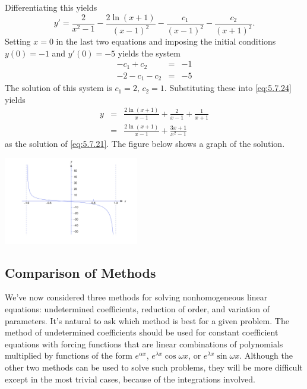 \documentclass{ximera}
\begin{document}
\begin{example}
\begin{explanation}
\begin{equation}
\end{equation}
Differentiating this yields
$$
y'=\frac{2}{x^2-1}-\frac{2\ln(x+1)}{(x-1)^2}-\frac{c_1}{(x-1)^2}-\frac{c_2}{(x+1)^2}.
$$
Setting $x=0$ in the last two equations and imposing the initial conditions
$y(0)=-1$ and $y'(0)=-5$ yields the system
\begin{eqnarray*}
-c_1+c_2&=&-1\\
-2-c_1-c_2&=&-5
\end{eqnarray*}
The solution of this system is $c_1=2,\,c_2=1$.  Substituting
these into
\eqref{eq:5.7.24} yields
\begin{eqnarray*}
y&=&\frac{2\ln(x+1)}{x-1}+\frac{2}{x-1}+\frac{1}{x+1}\\
&=&\frac{2\ln(x+1)}{x-1}+\frac{3x+1}{x^2-1}
\end{eqnarray*}
as the solution of  \eqref{eq:5.7.21}. The figure below shows a graph of the solution.


\begin{image}
  \includegraphics[height=1.5in]{fig050701.jpg} 
\end{image}
\end{explanation}
\end{example}

\subsection{Comparison of Methods}

We've now considered three methods
for solving  nonhomogeneous linear equations: undetermined
coefficients, reduction of order, and variation of parameters. It's
natural to ask which method is best for a given problem. The method of
undetermined coefficients should be used for constant coefficient
equations with forcing functions that are linear combinations of
polynomials multiplied by functions of the form $e^{\alpha x}$,
$e^{\lambda x}\cos \omega x$, or $e^{\lambda x}\sin \omega x$.
Although the other two methods can be used to solve such problems,
they will be more difficult except in the most trivial cases, because
of the integrations involved.
\end{document}
